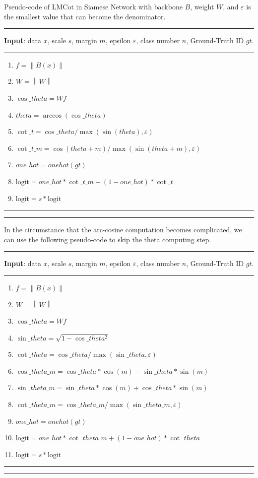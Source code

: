 Pseudo-code of LMCot in Siamese Network with backbone $B$, weight $W$, and $\varepsilon$ is the smallest value that can become the denominator.\\
\noindent\rule{\linewidth}{0.4pt}
{\raggedright \textbf{Input}: data $x$, scale $s$, margin $m$, epsilon $\varepsilon $, class number $n$, Ground-Truth ID $gt$. \par}
\noindent\rule{\linewidth}{0.4pt}
\begin{enumerate}
\item $f=\left\| B\left( x \right) \right\|$
\item $W=\left\| W \right\|$
\item $\cos \_theta=Wf$
\item $theta=\arccos \left( \cos \_theta \right)$
\item $\cot \_t=\cos \_theta /\max \left( \sin \left( theta \right),\varepsilon  \right)$
\item $\cot \_t\_m=\cos \left( theta + m \right)/\max \left(\sin \left( theta+m \right), \varepsilon \right)$
\item $one\_hot=onehot\left( gt \right)$
\item $\text{logit}=one\_hot*\cot \_t\_m + \left( 1-one\_hot \right)*\cot \_t $
\item $\text{logit}=s*\text{logit}$
\end{enumerate}
\noindent\rule{\linewidth}{0.4pt}
\noindent\rule{\linewidth}{0.4pt}
{\raggedright In the circumstance that the arc-cosine computation becomes complicated, we can use the following pseudo-code to skip the theta computing step. \par}
\noindent\rule{\linewidth}{0.4pt}
{\raggedright\textbf{Input}: data $x$, scale $s$, margin $m$, epsilon $\varepsilon $, class number $n$, Ground-Truth ID $gt$.\par}
\noindent\rule{\linewidth}{0.4pt}
\begin{enumerate}
\item $f=\left\| B\left( x \right) \right\|$
\item $W=\left\| W \right\|$
\item $\cos \_theta=Wf$
\item $\sin \_theta=\sqrt{1-\cos \_thet{{a}^{2}}}$
\item $\cot \_theta=\cos \_theta/\max \left(\sin \_theta, \varepsilon \right)$
\item $\cos \_theta\_m=\cos \_theta*\cos \left( m \right) -\sin \_theta*\sin \left( m \right) $
\item $\sin \_theta\_m=\sin \_theta*\cos \left( m \right)+\cos \_theta*\sin \left( m \right) $ 
\item	$\cot \_theta\_m=\cos \_theta\_m/ \max \left(\sin \_theta\_m, \varepsilon \right)$
\item $one\_hot=onehot\left( gt \right)$
\item $\text{logit}=one\_hot*\cot \_theta\_m + \left( 1-one\_hot \right)*\cot \_theta $
\item $\text{logit}=s*\text{logit}$
\end{enumerate}
\noindent\rule{\linewidth}{0.4pt}
\noindent\rule{\linewidth}{0.4pt}

